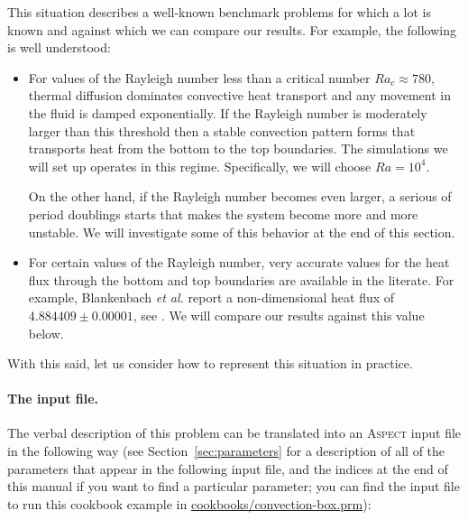 \documentclass{article}
\newcommand{\aspect}{\textsc{Aspect}}
\begin{document}
This situation describes a well-known benchmark problems for which a lot is
known and against which we can compare our results. For example, the following
is well understood:
\begin{itemize}
  \item For values of the Rayleigh number less than a critical number
  $Ra_c\approx 780$, thermal diffusion dominates convective heat transport and
  any movement in the fluid is damped exponentially. If the Rayleigh number is moderately larger
  than this threshold then a stable convection pattern forms that transports
  heat from the bottom to the top boundaries. The simulations we will set up
  operates in this regime. Specifically, we will choose $Ra=10^4$.

  On the other hand, if the Rayleigh number becomes even larger, a serious of
  period doublings starts that makes the system become more and more unstable.
  We will investigate some of this behavior at the end of this section.

  \item For certain values of the Rayleigh number, very accurate values for the
  heat flux through the bottom and top boundaries are available in the literate.
  For example, Blankenbach \textit{et al.} report a non-dimensional heat flux of
  $4.884409 \pm 0.00001$, see \cite{BBC89}. We will compare our results against
  this value below.
\end{itemize}

With this said, let us consider how to represent this situation in practice.


\paragraph{The input file.}
The verbal description of this problem can be translated into an \aspect{}
input file in the following way (see Section~\ref{sec:parameters} for a
description of all of the parameters that appear in the following input file,
and the indices at the end of this manual if you want to find a particular
parameter; you can find the input file to run this cookbook example in
\url{cookbooks/convection-box.prm}):
\end{document}
